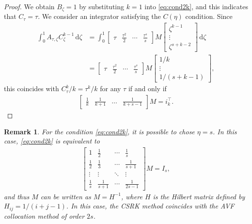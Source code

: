 \documentclass[final,leqno,onefignum,onetabnum]{siamltex1213}
\newtheorem{remark}{Remark}
\begin{document}
\begin{proof}
We obtain $B_\zeta=1$ by substituting $k=1$ into \eqref{eq:cond2k},
and this indicates that $C_\tau = \tau$.
We consider an integrator satisfying the $C(\eta)$ condition.
Since 
\begin{align*}
\int_0^1 A_{\tau,\zeta}C_\zeta^{k-1}\,{\mathrm d}\zeta
&=
\int_0^1
\begin{bmatrix}
\tau & \frac{\tau^2}{2}& \cdots & \frac{\tau^s}{s}
\end{bmatrix}
M
\begin{bmatrix}
\zeta^{k-1} \\ \vdots \\ \zeta^{s+k-2}
\end{bmatrix}\,{\mathrm d}\zeta \\
&=
\begin{bmatrix}
\tau & \frac{\tau^2}{2}& \cdots & \frac{\tau^s}{s}
\end{bmatrix}
M
\begin{bmatrix}
1/k \\ \vdots \\ 1/(s+k-1)
\end{bmatrix},
\end{align*}
this coincides with $C_\tau^k/k = \tau^k/k$ for any $\tau$
if and only if 
\begin{align}
\begin{bmatrix}
\frac{1}{k} & \frac{1}{k+1} & \dots & \frac{1}{k+s-1} 
\end{bmatrix}
M = i_k^\top.
\end{align}
\end{proof}

\begin{remark}
For the condition \eqref{eq:cond2k},
it is possible to chose $\eta = s$.
In this case, \eqref{eq:cond2k} is equivalent to
\begin{align*}
\begin{bmatrix}
1 & \frac{1}{2} & \cdots & \frac{1}{s} \\
\frac{1}{2} & \frac{1}{3} & \cdots & \frac{1}{s+1}\\
\vdots & \vdots & \ddots & \vdots \\
\frac{1}{s} & \frac{1}{s+1} & \cdots & \frac{1}{2s-1}
\end{bmatrix}
M
= I_s,
\end{align*}
and thus $M$ can be written as $M = H^{-1}$,
where $H$ is the Hilbert matrix defined by
$H_{ij} = 1/(i+j-1)$.
In this case, the CSRK method coincides with the AVF collocation method
of order $2s$.
\end{remark}
\end{document}
